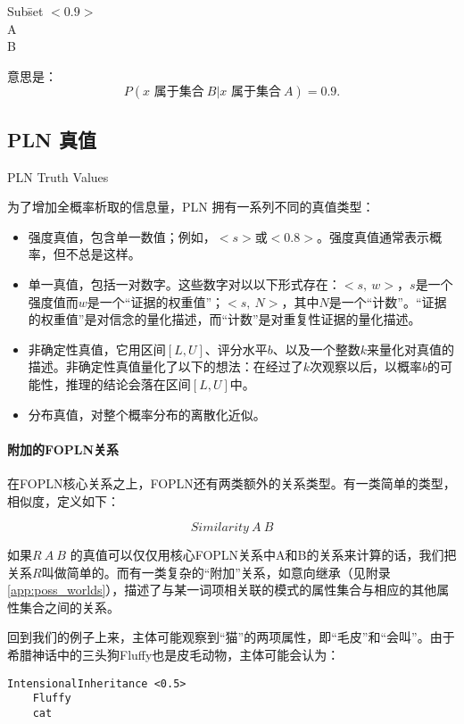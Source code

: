 \begin{tabbing}
Sub\=set $<0.9>$\\
\>A\\
\>B\\
\end{tabbing}

意思是：$$P(x \mbox{ 属于集合}\ B\vert x \mbox{ 属于集合}\ A) = 0.9.$$ 

\subsection{PLN 真值}{PLN Truth Values}

为了增加全概率析取的信息量，PLN 拥有一系列不同的真值类型：

\begin{itemize}
\item 强度真值，包含单一数值；例如，$<s>$或$<0.8>$。强度真值通常表示概率，但不总是这样。
\item 单一真值，包括一对数字。这些数字对以以下形式存在：$<s,\ w>$，$s$是一个强度值而$w$是一个“证据的权重值”；$<s,\ N>$，其中$N$是一个“计数”。“证据的权重值”是对信念的量化描述，而“计数”是对重复性证据的量化描述。
\item 非确定性真值，它用区间$[L,U]$、评分水平$b$、以及一个整数$k$来量化对真值的描述。非确定性真值量化了以下的想法：在经过了$k$次观察以后，以概率$b$的可能性，推理的结论会落在区间$[L,U]$中。
\item 分布真值，对整个概率分布的离散化近似。
\end{itemize}

\paragraph{附加的FOPLN关系}

在FOPLN核心关系之上，FOPLN还有两类额外的关系类型。有一类简单的类型，相似度，定义如下：

$$
Similarity \ A \ B
$$

如果$R \ A \ B$ 的真值可以仅仅用核心FOPLN关系中A和B的关系来计算的话，我们把关系$R$叫做简单的。而有一类复杂的“附加”关系，如意向继承（见附录\ref{app:poss_worlds}），描述了与某一词项相关联的模式的属性集合与相应的其他属性集合之间的关系。

回到我们的例子上来，主体可能观察到“猫”的两项属性，即“毛皮”和“会叫”。由于希腊神话中的三头狗Fluffy也是皮毛动物，主体可能会认为：

{\tt\begin{small}\begin{lstlisting}
IntensionalInheritance <0.5>
	Fluffy  
	cat
\end{lstlisting}\end{small}}


